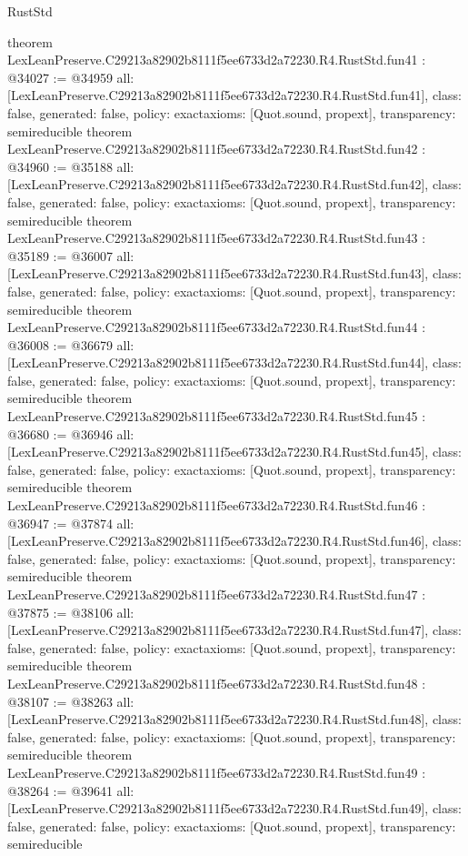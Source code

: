 \begin{lexlean}{RustStd}
\begin{coremodule}
{}
theorem LexLeanPreserve.C29213a82902b8111f5ee6733d2a72230.R4.RustStd.fun41 : @34027 := @34959 {
  all: [LexLeanPreserve.C29213a82902b8111f5ee6733d2a72230.R4.RustStd.fun41],
  class: false,
  generated: false,
  policy: exact{axioms: [Quot.sound, propext]},
  transparency: semireducible
}
theorem LexLeanPreserve.C29213a82902b8111f5ee6733d2a72230.R4.RustStd.fun42 : @34960 := @35188 {
  all: [LexLeanPreserve.C29213a82902b8111f5ee6733d2a72230.R4.RustStd.fun42],
  class: false,
  generated: false,
  policy: exact{axioms: [Quot.sound, propext]},
  transparency: semireducible
}
theorem LexLeanPreserve.C29213a82902b8111f5ee6733d2a72230.R4.RustStd.fun43 : @35189 := @36007 {
  all: [LexLeanPreserve.C29213a82902b8111f5ee6733d2a72230.R4.RustStd.fun43],
  class: false,
  generated: false,
  policy: exact{axioms: [Quot.sound, propext]},
  transparency: semireducible
}
theorem LexLeanPreserve.C29213a82902b8111f5ee6733d2a72230.R4.RustStd.fun44 : @36008 := @36679 {
  all: [LexLeanPreserve.C29213a82902b8111f5ee6733d2a72230.R4.RustStd.fun44],
  class: false,
  generated: false,
  policy: exact{axioms: [Quot.sound, propext]},
  transparency: semireducible
}
theorem LexLeanPreserve.C29213a82902b8111f5ee6733d2a72230.R4.RustStd.fun45 : @36680 := @36946 {
  all: [LexLeanPreserve.C29213a82902b8111f5ee6733d2a72230.R4.RustStd.fun45],
  class: false,
  generated: false,
  policy: exact{axioms: [Quot.sound, propext]},
  transparency: semireducible
}
theorem LexLeanPreserve.C29213a82902b8111f5ee6733d2a72230.R4.RustStd.fun46 : @36947 := @37874 {
  all: [LexLeanPreserve.C29213a82902b8111f5ee6733d2a72230.R4.RustStd.fun46],
  class: false,
  generated: false,
  policy: exact{axioms: [Quot.sound, propext]},
  transparency: semireducible
}
theorem LexLeanPreserve.C29213a82902b8111f5ee6733d2a72230.R4.RustStd.fun47 : @37875 := @38106 {
  all: [LexLeanPreserve.C29213a82902b8111f5ee6733d2a72230.R4.RustStd.fun47],
  class: false,
  generated: false,
  policy: exact{axioms: [Quot.sound, propext]},
  transparency: semireducible
}
theorem LexLeanPreserve.C29213a82902b8111f5ee6733d2a72230.R4.RustStd.fun48 : @38107 := @38263 {
  all: [LexLeanPreserve.C29213a82902b8111f5ee6733d2a72230.R4.RustStd.fun48],
  class: false,
  generated: false,
  policy: exact{axioms: [Quot.sound, propext]},
  transparency: semireducible
}
theorem LexLeanPreserve.C29213a82902b8111f5ee6733d2a72230.R4.RustStd.fun49 : @38264 := @39641 {
  all: [LexLeanPreserve.C29213a82902b8111f5ee6733d2a72230.R4.RustStd.fun49],
  class: false,
  generated: false,
  policy: exact{axioms: [Quot.sound, propext]},
  transparency: semireducible
}
\end{coremodule}
\end{lexlean}
